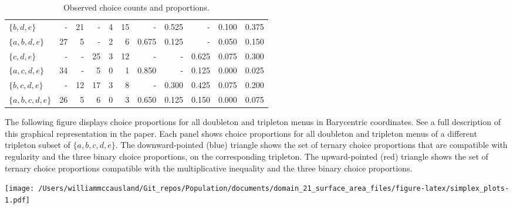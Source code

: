 \documentclass[
]{article}
\begin{document}
\begin{table}
\begin{tabular}{lrrrrrrrrrr}
\addlinespace
$\{b,d,e\}$ & - & 21 & - & 4 & 15 & - & 0.525 & - & 0.100 & 0.375\\
$\{a,b,d,e\}$ & 27 & 5 & - & 2 & 6 & 0.675 & 0.125 & - & 0.050 & 0.150\\
$\{c,d,e\}$ & - & - & 25 & 3 & 12 & - & - & 0.625 & 0.075 & 0.300\\
$\{a,c,d,e\}$ & 34 & - & 5 & 0 & 1 & 0.850 & - & 0.125 & 0.000 & 0.025\\
$\{b,c,d,e\}$ & - & 12 & 17 & 3 & 8 & - & 0.300 & 0.425 & 0.075 & 0.200\\
\addlinespace
$\{a,b,c,d,e\}$ & 26 & 5 & 6 & 0 & 3 & 0.650 & 0.125 & 0.150 & 0.000 & 0.075\\
\bottomrule
\end{tabular}
\caption{Observed choice counts and proportions.}
\label{t:count_prop}
\end{table}

The following figure displays choice proportions for all doubleton and
tripleton menus in Barycentric coordinates. See a full description of
this graphical representation in the paper. Each panel shows choice
proportions for all doubleton and tripleton menus of a different
tripleton subset of \(\{a,b,c,d,e\}\). The downward-pointed (blue)
triangle shows the set of ternary choice proportions that are compatible
with regularity and the three binary choice proportions, on the
corresponding tripleton. The upward-pointed (red) triangle shows the set
of ternary choice proportions compatible with the multiplicative
inequality and the three binary choice proportions.

\texttt{[image: /Users/williammccausland/Git\_repos/Population/documents/domain\_21\_surface\_area\_files/figure-latex/simplex\_plots-1.pdf]}
\end{document}
